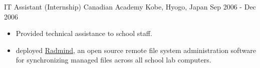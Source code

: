 \cventry
  {IT Assistant (Internship)} %
  {Canadian Academy} %
  {Kobe, Hyogo, Japan} %
  {Sep 2006 - Dec 2006} %
  {
    \begin{itemize} %
      \liststyle
      \item {Provided technical assistance to school staff.}
      \item { deployed \href{http://www.radmind.org/}{Radmind}, an open source remote file system administration software for synchronizing managed files across all school lab computers.}
    \end{itemize}
  }
